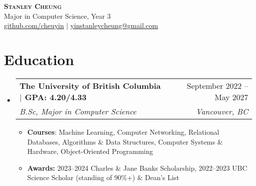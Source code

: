 \documentclass[letterpaper]{article}
\makeatletter
\newcommand{\resumeItem}[1]{
  \item\small{
    {#1 \vspace{-2pt}}
  }
}
\newcommand{\resumeSubheading}[4]{
  \vspace{-2pt}\item
    \begin{tabular*}{0.97\textwidth}[t]{l@{\extracolsep{\fill}}r}
      \textbf{#1} & #2 \\
      \textit{\small#3} & \textit{\small #4} \\
    \end{tabular*}\vspace{-7pt}
}
\newcommand{\resumeSubHeadingListStart}{\begin{itemize}[leftmargin=0.15in, label={}]}
\newcommand{\resumeSubHeadingListEnd}{\end{itemize}}
\newcommand{\resumeItemListStart}{\begin{itemize}}
\newcommand{\resumeItemListEnd}{\end{itemize}\vspace{-5pt}}
\makeatother
\begin{document}

\begin{center}
    \color{NavyBlue}
    \textbf{\huge \scshape Stanley Cheung} \\ 
    \vspace{5pt}
    \color{black}
    {\large Major in Computer Science, Year 3} \\
    \vspace{5pt}    
    \href{https://github.com/cheuyin}{\underline{github.com/cheuyin}} $|$
    \href{mailto:yinstanleycheung@gmail.com}{\underline{yinstanleycheung@gmail.com}}
\end{center}

\color{NavyBlue}
\section{Education}
\color{black}
  \resumeSubHeadingListStart
    \resumeSubheading
      {The University of British Columbia $|$ GPA: 4.20/4.33}{September 2022 -- May 2027}
      {B.Sc, Major in Computer Science}{Vancouver, BC}
      \resumeItemListStart 
        \resumeItem{\textbf{Courses}: Machine Learning, Computer Networking, Relational Databases, Algorithms \& Data Structures, Computer Systems \& Hardware, Object-Oriented Programming}
        \resumeItem{\textbf{Awards:} 2023--2024 Charles \& Jane Banks Scholarship, 2022--2023 UBC Science Scholar (standing of 90\%+) \& Dean's List}
      \resumeItemListEnd 
  \resumeSubHeadingListEnd

\color{NavyBlue}
\end{document}
